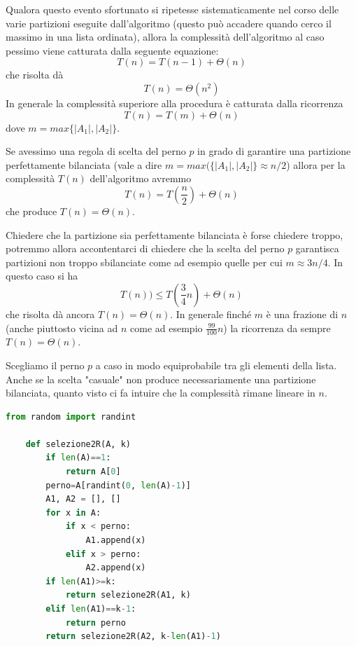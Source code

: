 Qualora questo evento sfortunato si ripetesse sistematicamente nel corso delle varie partizioni eseguite dall'algoritmo (questo può accadere quando cerco il massimo in una lista ordinata), allora la complessità dell'algoritmo al caso pessimo viene catturata dalla seguente equazione:
\begin{equation*}
    T(n)=T(n-1)+ \Theta(n)    
\end{equation*}
che risolta dà
\begin{equation*}
    T(n) = \Theta(n^2)    
\end{equation*}
In generale la complessità superiore alla procedura è catturata dalla ricorrenza
\begin{equation*}
    T(n) = T(m) + \Theta(n)    
\end{equation*}
dove $m = max\{|A_1|,|A_2|\}$.

Se avessimo una regola di scelta del perno $p$ in grado di garantire una partizione perfettamente bilanciata (vale a dire $m=max(\{|A_1|, |A_2|\}\approx n/2$) allora per la complessità $T(n)$ dell'algoritmo avremmo
\begin{equation*}
    T(n) = T\left(\frac{n}{2}\right) + \Theta(n)
\end{equation*}
che produce $T(n) = \Theta(n)$.

Chiedere che la partizione sia perfettamente bilanciata è forse chiedere troppo, potremmo allora accontentarci di chiedere che la scelta del perno $p$ garantisca partizioni non troppo sbilanciate come ad esempio quelle per cui $m\approx 3n/4$. In questo caso si ha
\begin{equation*}
    T(n) )\leq T\left(\frac{3}{4}n\right)+\Theta(n)
\end{equation*}
che risolta dà ancora $T(n) = \Theta(n)$.
In generale finché $m$ è una frazione di $n$ (anche piuttosto vicina ad $n$ come ad esempio $\frac{99}{100}n$) la ricorrenza da sempre $T(n) = \Theta(n)$.

Scegliamo il perno $p$ a caso in modo equiprobabile tra gli elementi della lista.
Anche se la scelta "casuale" non produce necessariamente una partizione bilanciata, quanto visto ci fa intuire che la complessità rimane lineare in $n$.

\begin{lstlisting}[language=Python]
    from random import randint

    def selezione2R(A, k)
        if len(A)==1:
            return A[0]
        perno=A[randint(0, len(A)-1)]
        A1, A2 = [], []
        for x in A:
            if x < perno:
                A1.append(x)
            elif x > perno:
                A2.append(x)
        if len(A1)>=k:
            return selezione2R(A1, k)
        elif len(A1)==k-1:
            return perno
        return selezione2R(A2, k-len(A1)-1)
\end{lstlisting}

